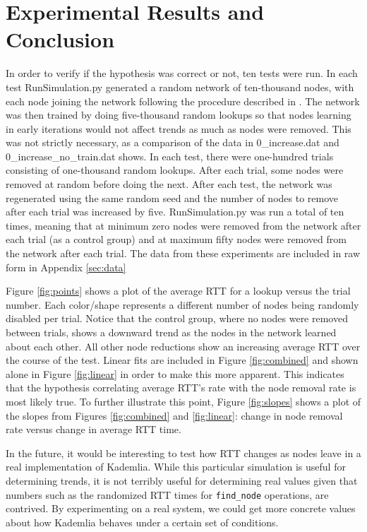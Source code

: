 \documentclass[notitlepage,12pt]{article}
\begin{document}
\section{Experimental Results and Conclusion}
\label{sec:expres}

In order to verify if the hypothesis was correct or not, ten tests were run. In
each test RunSimulation.py generated a random network of ten-thousand nodes,
with each node joining the network following the procedure described in
\cite{kademlia}. The network was then trained by doing five-thousand random
lookups so that nodes learning in early iterations would not affect trends as
much as nodes were removed. This was not strictly necessary, as a comparison of
the data in 0\_increase.dat and 0\_increase\_no\_train.dat shows.
In each test, there were one-hundred trials consisting of
one-thousand random lookups. After each trial, some nodes were removed at random
before doing the next. After each test, the network was regenerated using the
same random seed and the number of nodes to remove after each trial was
increased by five. RunSimulation.py was run a total of ten times, meaning that
at minimum zero nodes were removed from the network after each trial (as a
control group) and at maximum fifty nodes were removed from the network after
each trial. The data from these experiments are included in raw form in Appendix \ref{sec:data}

Figure \ref{fig:points} shows a plot of the average RTT for a lookup versus the
trial number. Each color/shape represents a different number of nodes being
randomly disabled per trial. Notice that the control group, where no nodes were
removed between trials, shows a downward trend as the nodes in the network
learned about each other. All other node reductions show an increasing average
RTT over the course of the test. Linear fits are included in Figure
\ref{fig:combined} and shown alone in Figure \ref{fig:linear} in order to make this
more apparent. This indicates that the hypothesis correlating average RTT's rate
with the node removal rate is most likely true. To further illustrate this
point, Figure \ref{fig:slopes} shows a plot of the slopes from Figures
\ref{fig:combined} and \ref{fig:linear}: change in node removal rate versus
change in average RTT time.

In the future, it would be interesting to test how RTT changes as nodes leave in
a real implementation of Kademlia. While this particular simulation is useful
for determining trends, it is not terribly useful for determining real values
given that numbers such as the randomized RTT times for \texttt{find\_node}
operations, are contrived. By experimenting on a real system, we could get more
concrete values about how Kademlia behaves under a certain set of conditions. 
\end{document}
